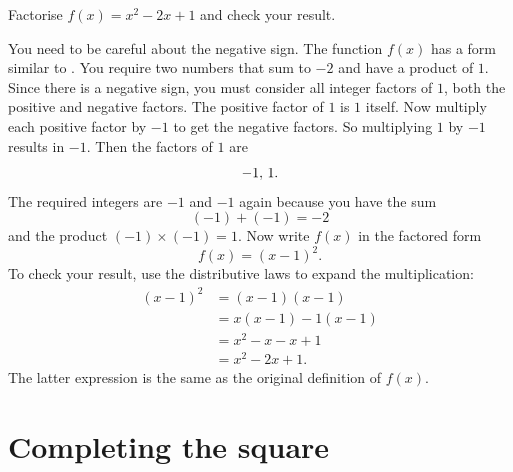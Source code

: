 \documentclass[a4paper,oneside,12pt]{article}
\begin{document}
\begin{example}
Factorise $f(x) = x^2 - 2x + 1$ and check your result.
\end{example}

\begin{solution}
You need to be careful about the negative sign.  The function $f(x)$
has a form similar to .  You
require two numbers that sum to $-2$ and have a product of $1$.  Since
there is a negative sign, you must consider all integer factors of
$1$, both the positive and negative factors.  The positive factor of
$1$ is $1$ itself.  Now multiply each positive factor by $-1$ to get
the negative factors.  So multiplying $1$ by $-1$ results in $-1$.
Then the factors of $1$ are
\[
{-1},\, {1}.
\]
The required integers are $-1$ and $-1$ again because you have the sum
\[
(-1) + (-1)
=
-2
\]
and the product $(-1) \times (-1) = 1$.  Now write $f(x)$ in the
factored form
\[
f(x)
=
(x - 1)^2.
\]
To check your result, use the distributive laws to expand the
multiplication:
\begin{align*}
(x - 1)^2
&=
(x - 1) (x - 1) \\[4pt]
&=
x(x - 1) - 1(x - 1) \\[4pt]
&=
x^2 - x - x + 1 \\[4pt]
&=
x^2 - 2x + 1.
\end{align*}
The latter expression is the same as the original definition of
$f(x)$.
\end{solution}



\section{Completing the square}
\end{document}
